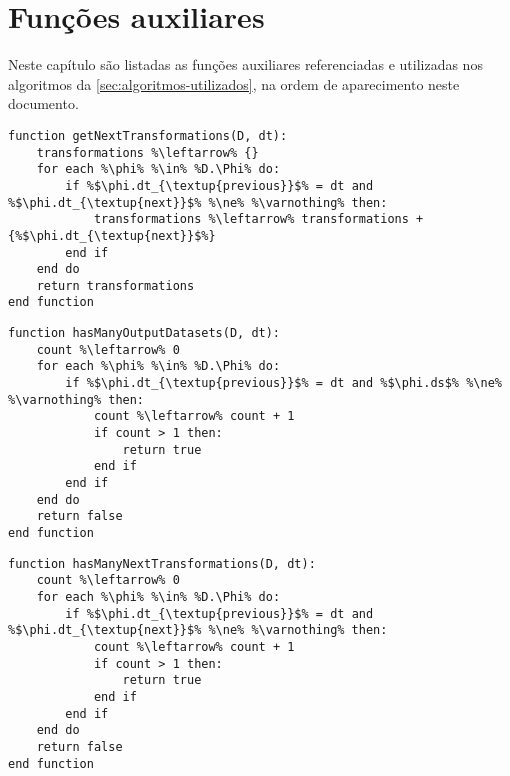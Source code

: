 
\chapter{Funções auxiliares}%
\label{app:funcoes-auxiliares}

Neste capítulo são listadas as funções auxiliares referenciadas e utilizadas nos algoritmos da \autoref{sec:algoritmos-utilizados}, na ordem de aparecimento neste documento.

\begin{lstlisting}[language=pseudocode,label={lst:get-next-transformations},caption={[Obtenção das próximas transformações de dados de uma transformação]Obtenção das próximas transformações de dados de uma transformação de dados.}]
function getNextTransformations(D, dt):
    transformations %\leftarrow% {}
    for each %\phi% %\in% %D.\Phi% do:
        if %$\phi.dt_{\textup{previous}}$% = dt and %$\phi.dt_{\textup{next}}$% %\ne% %\varnothing% then:
            transformations %\leftarrow% transformations + {%$\phi.dt_{\textup{next}}$%}
        end if
    end do
    return transformations
end function
\end{lstlisting}
 \begin{lstlisting}[language=pseudocode,label={lst:has-many-output-datasets},caption={[Contagem dos conjuntos de dados de saída de uma transformação]Contagem dos conjuntos de dados de saída de uma transformação de dados. Retorna verdadeiro caso essa quantidade seja maior do que um, e falso caso contrário.}]
function hasManyOutputDatasets(D, dt):
    count %\leftarrow% 0
    for each %\phi% %\in% %D.\Phi% do:
        if %$\phi.dt_{\textup{previous}}$% = dt and %$\phi.ds$% %\ne% %\varnothing% then:
            count %\leftarrow% count + 1
            if count > 1 then:
                return true
            end if
        end if
    end do
    return false
end function
\end{lstlisting}
 \begin{lstlisting}[language=pseudocode,label={lst:has-many-next-transformations},caption={[Contagem das próximas transformações de dados de uma transformação]Contagem das próximas transformações de dados de uma transformação de dados. Retorna verdadeiro caso essa quantidade seja maior do que um, e falso caso contrário.}]
function hasManyNextTransformations(D, dt):
    count %\leftarrow% 0
    for each %\phi% %\in% %D.\Phi% do:
        if %$\phi.dt_{\textup{previous}}$% = dt and %$\phi.dt_{\textup{next}}$% %\ne% %\varnothing% then:
            count %\leftarrow% count + 1
            if count > 1 then:
                return true
            end if
        end if
    end do
    return false
end function
\end{lstlisting}
